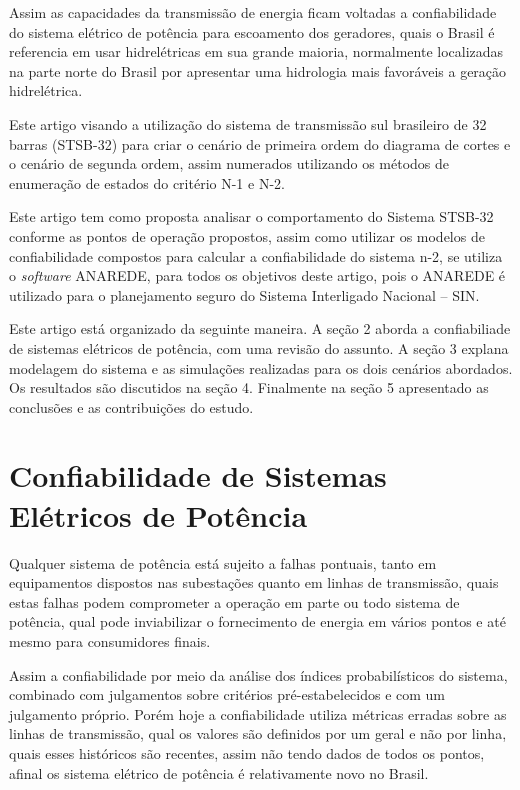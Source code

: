 \documentclass[lettersize,journal]{IEEEtran}
\begin{document}
Assim as capacidades da transmissão de energia ficam voltadas a confiabilidade do sistema elétrico de potência para escoamento dos geradores, quais o Brasil é referencia em usar hidrelétricas em sua grande maioria, normalmente localizadas na parte norte do Brasil por apresentar uma hidrologia mais favoráveis a geração hidrelétrica.

Este artigo visando a utilização do sistema de transmissão sul brasileiro de 32 barras (STSB-32) para criar o cenário de primeira ordem do diagrama de cortes e o cenário de segunda ordem, assim numerados utilizando os métodos de enumeração de estados do critério N-1 e N-2\cite{Lazari}.

Este artigo tem como proposta analisar o comportamento do Sistema STSB-32 conforme as pontos de operação propostos, assim como utilizar os modelos de confiabilidade compostos para calcular a confiabilidade do sistema n-2, se utiliza o \textit{software} ANAREDE, para todos os objetivos deste artigo, pois o ANAREDE é utilizado para o planejamento seguro do Sistema Interligado Nacional – SIN.

Este artigo está organizado da seguinte maneira. A seção 2 aborda a confiabiliade de sistemas elétricos de potência, com uma revisão do assunto. A seção 3 explana modelagem do sistema e as simulações realizadas para os dois cenários abordados. Os resultados são discutidos na seção 4. Finalmente na seção 5 apresentado as conclusões e as contribuições do estudo.

\section{Confiabilidade de Sistemas \\ Elétricos de Potência}

Qualquer sistema de potência está sujeito a falhas pontuais, tanto em equipamentos dispostos nas subestações quanto em linhas de transmissão, quais estas falhas podem comprometer a operação em parte ou todo sistema de potência, qual pode inviabilizar o fornecimento de energia em vários pontos e até mesmo para consumidores finais.

Assim a confiabilidade por meio da análise dos índices probabilísticos do sistema, combinado com julgamentos sobre critérios pré-estabelecidos e com um julgamento próprio. Porém hoje a confiabilidade utiliza métricas erradas sobre as linhas de transmissão, qual os valores são definidos por um geral e não por linha, quais esses históricos são recentes, assim não tendo dados de todos os pontos, afinal os sistema elétrico de potência é relativamente novo no Brasil.
\end{document}

